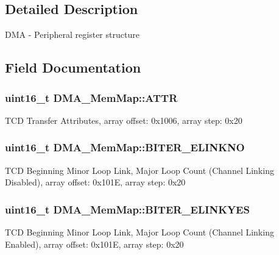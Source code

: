 \begin{DoxyCompactItemize}
\begin{tabbing}
\end{tabbing}\end{DoxyCompactItemize}


\subsection{Detailed Description}
D\+M\+A -\/ Peripheral register structure 

\subsection{Field Documentation}
\hypertarget{struct_d_m_a___mem_map_ad79f464644f5998377c1a7f63fdaaa6c}{}
\subsubsection[{A\+T\+T\+R}]{\setlength{\rightskip}{0pt plus 5cm}uint16\+\_\+t D\+M\+A\+\_\+\+Mem\+Map\+::\+A\+T\+T\+R}\label{struct_d_m_a___mem_map_ad79f464644f5998377c1a7f63fdaaa6c}
T\+C\+D Transfer Attributes, array offset\+: 0x1006, array step\+: 0x20 \hypertarget{struct_d_m_a___mem_map_ab5a88bd570bf66e4186b2363c84bd015}{}
\subsubsection[{B\+I\+T\+E\+R\+\_\+\+E\+L\+I\+N\+K\+N\+O}]{\setlength{\rightskip}{0pt plus 5cm}uint16\+\_\+t D\+M\+A\+\_\+\+Mem\+Map\+::\+B\+I\+T\+E\+R\+\_\+\+E\+L\+I\+N\+K\+N\+O}\label{struct_d_m_a___mem_map_ab5a88bd570bf66e4186b2363c84bd015}
T\+C\+D Beginning Minor Loop Link, Major Loop Count (Channel Linking Disabled), array offset\+: 0x101\+E, array step\+: 0x20 \hypertarget{struct_d_m_a___mem_map_a352e7d2300de3264c6a49f1ce813e149}{}
\subsubsection[{B\+I\+T\+E\+R\+\_\+\+E\+L\+I\+N\+K\+Y\+E\+S}]{\setlength{\rightskip}{0pt plus 5cm}uint16\+\_\+t D\+M\+A\+\_\+\+Mem\+Map\+::\+B\+I\+T\+E\+R\+\_\+\+E\+L\+I\+N\+K\+Y\+E\+S}\label{struct_d_m_a___mem_map_a352e7d2300de3264c6a49f1ce813e149}
T\+C\+D Beginning Minor Loop Link, Major Loop Count (Channel Linking Enabled), array offset\+: 0x101\+E, array step\+: 0x20 \hypertarget{struct_d_m_a___mem_map_ab41bdc9f4302f141db34641e6cf21e85}{}
